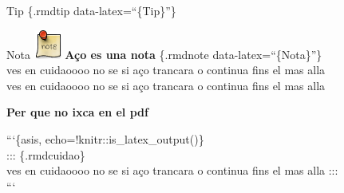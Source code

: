\documentclass[
  10pt,
]{krantz}
\begin{document}
\begin{rmdtip}{Tip}
\{.rmdtip data-latex=``\{Tip\}''\}

\end{rmdtip}

\begin{rmdnote}{Nota}
\includegraphics{imatges/note.png} \textbf{Aço es una nota} \{.rmdnote data-latex=``\{Nota\}''\}\\
ves en cuidaoooo no se si aço trancara o continua fins el mas alla\\
ves en cuidaoooo no se si aço trancara o continua fins el mas alla

\end{rmdnote}

\begin{rmdinfo}{}
\textbf{Per que no ixca en el pdf}

```\{asis, echo=!knitr::is\_latex\_output()\}\\
::: \{.rmdcuidao\}\\
ves en cuidaoooo no se si aço trancara o continua fins el mas alla :::\\
```

\end{rmdinfo}

  
\end{document}
